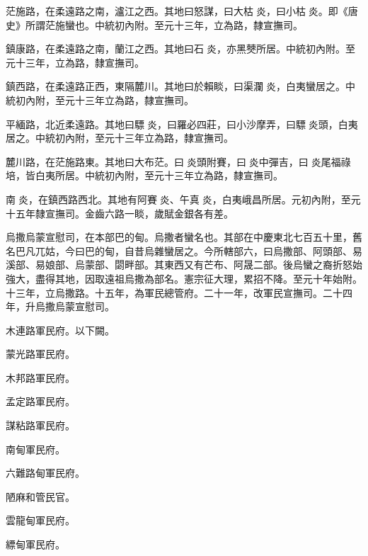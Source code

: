 \begin{pinyinscope}
 茫施路，在柔遠路之南，瀘江之西。其地曰怒謀，曰大枯炎，曰小枯炎。即《唐史》所謂茫施蠻也。中統初內附。至元十三年，立為路，隸宣撫司。



 鎮康路，在柔遠路之南，蘭江之西。其地曰石炎，亦黑僰所居。中統初內附。至元十三年，立為路，隸宣撫司。



 鎮西路，在柔遠路正西，東隔麓川。其地曰於賴睒，曰渠瀾炎，白夷蠻居之。中統初內附，至元十三年立為路，隸宣撫司。



 平緬路，北近柔遠路。其地曰驃炎，曰羅必四莊，曰小沙摩弄，曰驃炎頭，白夷居之。中統初內附，至元十三年立為路，隸宣撫司。



 麓川路，在茫施路東。其地曰大布茫。曰炎頭附賽，曰炎中彈吉，曰炎尾福祿培，皆白夷所居。中統初內附，至元十三年立為路，隸宣撫司。



 南炎，在鎮西路西北。其地有阿賽炎、午真炎，白夷峨昌所居。元初內附，至元十五年隸宣撫司。金齒六路一睒，歲賦金銀各有差。



 烏撒烏蒙宣慰司，在本部巴的甸。烏撒者蠻名也。其部在中慶東北七百五十里，舊名巴凡兀姑，今曰巴的甸，自昔烏雜蠻居之。今所轄部六，曰烏撒部、阿頭部、易溪部、易娘部、烏蒙部、閟畔部。其東西又有芒布、阿晟二部。後烏蠻之裔折怒始強大，盡得其地，因取遠祖烏撒為部名。憲宗征大理，累招不降。至元十年始附。十三年，立烏撒路。十五年，為軍民總管府。二十一年，改軍民宣撫司。二十四年，升烏撒烏蒙宣慰司。



 木連路軍民府。以下闕。



 蒙光路軍民府。



 木邦路軍民府。



 孟定路軍民府。



 謀粘路軍民府。



 南甸軍民府。



 六難路甸軍民府。



 陋麻和管民官。



 雲龍甸軍民府。



 縹甸軍民府。




\end{pinyinscope}
